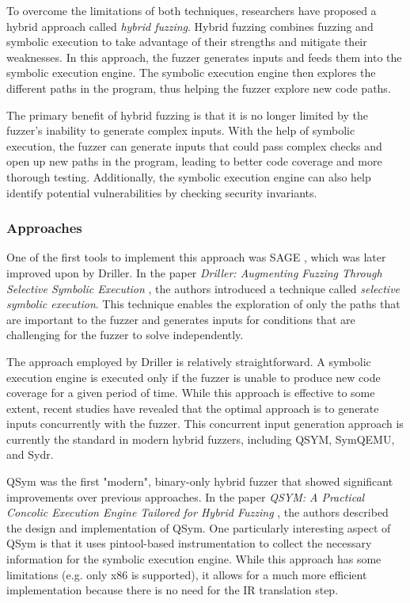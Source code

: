 To overcome the limitations of both techniques, researchers have proposed a hybrid approach called \textit{hybrid fuzzing}. Hybrid fuzzing combines fuzzing and symbolic execution to take advantage of their strengths and mitigate their weaknesses. In this approach, the fuzzer generates inputs and feeds them into the symbolic execution engine. The symbolic execution engine then explores the different paths in the program, thus helping the fuzzer explore new code paths.

The primary benefit of hybrid fuzzing is that it is no longer limited by the fuzzer's inability to generate complex inputs. With the help of symbolic execution, the fuzzer can generate inputs that could pass complex checks and open up new paths in the program, leading to better code coverage and more thorough testing. Additionally, the symbolic execution engine can also help identify potential vulnerabilities by checking security invariants.

\subsubsection{Approaches}

One of the first tools to implement this approach was SAGE \cite{sage-acm-2012}, which was later improved upon by Driller. In the paper \textit{Driller: Augmenting Fuzzing Through Selective Symbolic Execution} \cite{driller-ndss16}, the authors introduced a technique called \textit{selective symbolic execution}. This technique enables the exploration of only the paths that are important to the fuzzer and generates inputs for conditions that are challenging for the fuzzer to solve independently.

The approach employed by Driller is relatively straightforward. A symbolic execution engine is executed only if the fuzzer is unable to produce new code coverage for a given period of time. While this approach is effective to some extent, recent studies have revealed that the optimal approach is to generate inputs concurrently with the fuzzer. This concurrent input generation approach is currently the standard in modern hybrid fuzzers, including QSYM, SymQEMU, and Sydr.


QSym was the first "modern", binary-only hybrid fuzzer that showed significant improvements over previous approaches. In the paper \textit{QSYM: A Practical Concolic Execution Engine Tailored for Hybrid Fuzzing} \cite{qsym-usenix2018}, the authors described the design and implementation of QSym. One particularly interesting aspect of QSym is that it uses pintool-based instrumentation to collect the necessary information for the symbolic execution engine. While this approach has some limitations (e.g. only x86 is supported), it allows for a much more efficient implementation because there is no need for the IR translation step.

